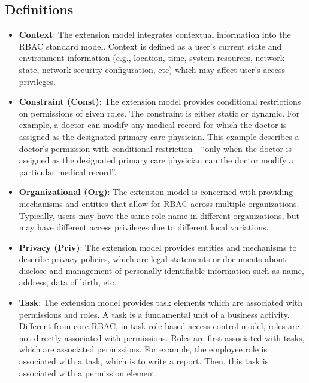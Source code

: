 \subsection{Definitions}

\begin{itemize}

  \item \textbf{Context}: The extension model integrates contextual information into the RBAC standard model. Context is defined as a user's current state and environment information (e.g., location, time, system resources, network state, network security configuration, etc) which may affect user's access privileges.

  \item \textbf{Constraint (Const)}: The extension model provides conditional restrictions on permissions of given roles. The constraint is either static or dynamic. For example, a doctor can modify any medical record for which the doctor is assigned as the designated primary care physician. This example describes a doctor's permission with conditional restriction - ``only when the doctor is assigned as the designated primary care physician can the doctor modify a particular medical record''.

  \item \textbf{Organizational (Org)}: The extension model is concerned with providing mechanisms and entities that allow for RBAC across multiple organizations. Typically, users may have the same role name in different organizations, but may have different access privileges due to different local variations.
  
  \item \textbf{Privacy (Priv)}: The extension model provides entities and mechanisms to describe privacy policies, which are legal statements or documents about disclose and management of personally identifiable information such as name, address, data of birth, etc.
  
  \item \textbf{Task}: The extension model provides task elements which are associated with permissions and roles. A task is a fundamental unit of a business activity. Different from core RBAC, in task-role-based access control model, roles are not directly associated with permissions. Roles are first associated with tasks, which are associated permissions. For example, the employee role is associated with a task, which is to write a report. Then, this task is associated with a permission element.


\end{itemize}
